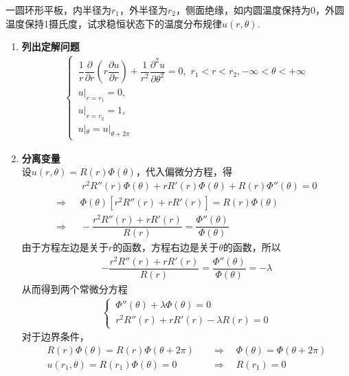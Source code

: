 \examples 一圆环形平板，内半径为$r_1$，外半径为$r_2$，侧面绝缘，如内圆温度保持为0，外圆温度保持1摄氏度，试求稳恒状态下的温度分布规律$u(r,\theta)$.

\solve
\begin{enumerate}[\textbf{步骤}1 ]
	\item \textbf{列出定解问题}
	\begin{align}
		\begin{cases}
			\, \dfrac{1}{r}\dfrac{\partial}{\partial r}\left(r \dfrac{\partial u}{\partial r}\right)+\dfrac{1}{r^2}\dfrac{\partial^2 u}{\partial \theta^2} =0, \,\, r_1<r<r_2, -\infty < \theta < + \infty\\[0.5em]
			\, u|_{r = r_1} = 0,\\
			\, u|_{r = r_2} = 1,\\
			\, u|_{\theta} = u|_{\theta + 2\pi}
		\end{cases}
	\end{align}
	
	\item \textbf{分离变量}\\
	设$u(r,\theta) = R(r) \Phi(\theta)$，代入偏微分方程，得
	\begin{align*}
		& \,\,\,\,\, r^2 R''(r)\Phi(\theta) + r R'(r)\Phi(\theta) +R(r) \Phi''(\theta) = 0\\
		\Rightarrow & \,\,\,\, \Phi(\theta)\left[r^2 R''(r) + rR'(r)\right] = R(r)\Phi(\theta)\\
		\Rightarrow & \,\,\,\, -\dfrac{r^2 R''(r) + rR'(r)}{R(r)}=\dfrac{\Phi''(\theta)}{\Phi(\theta)}
	\end{align*}
	由于方程左边是关于$r$的函数，方程右边是关于$\theta$的函数，所以
	\begin{align*}
		-\dfrac{r^2 R''(r) + rR'(r)}{R(r)}=\dfrac{\Phi''(\theta)}{\Phi(\theta)} = -\lambda
	\end{align*}
	从而得到两个常微分方程
	\begin{align*}
		\begin{cases}
			\, \Phi''(\theta) + \lambda \Phi(\theta) = 0\\
			\, r^2 R''(r) + rR'(r) - \lambda R(r) = 0
		\end{cases}
	\end{align*}
	对于边界条件，
	\begin{align*}
		R(r) \Phi(\theta) = R(r) \Phi(\theta + 2\pi) \quad &\Rightarrow \quad \Phi(\theta) = \Phi(\theta + 2\pi) \\
		u(r_1,\theta) = R(r_1) \Phi(\theta) = 0 \quad &\Rightarrow \quad R(r_1) = 0 
	\end{align*}
	

\end{enumerate}

